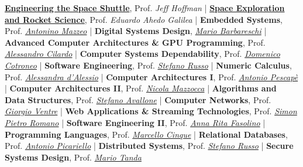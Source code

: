 \documentclass[letterpaper]{twentysecondcv} %
\begin{document}
\href{https://www.edx.org/course/engineering-the-space-shuttle}{\textbf{Engineering the Space Shuttle}}, Prof. \textit{Jeff Hoffman} |
\href{https://www.edx.org/course/the-conquest-of-space-space-exploration-and-rocket}{\textbf{Space Exploration and Rocket Science}}, Prof. \textit{Eduardo Ahedo Galilea} |
\textbf{Embedded Systems}, Prof. \href{https://www.docenti.unina.it/antonino.mazzeo}{\textit{Antonino Mazzeo}} |
\textbf{Digital Systems Design}, \href{https://www.researchgate.net/profile/Mario_Barbareschi}{\textit{Mario Barbareschi}} |
\textbf{Advanced Computer Architectures \& GPU Programming}, Prof. \href{https://www.docenti.unina.it/alessandro.cilardo}{\textit{Alessandro Cilardo}} |
\textbf{Computer Systems Dependability}, Prof. \href{https://www.docenti.unina.it/domenico.cotroneo}{\textit{Domenico Cotroneo}} |
\textbf{Software Engineering}, Prof. \href{https://www.docenti.unina.it/stefano.russo}{\textit{Stefano Russo}} |
\textbf{Numeric Calculus}, Prof. \href{https://www.docenti.unina.it/alessandra.dalessio}{\textit{Alessandra d'Alessio}} |
\textbf{Computer Architectures I}, Prof. \href{https://www.docenti.unina.it/antonio.pescape}{\textit{Antonio Pescapè}} |
\textbf{Computer Architectures II}, Prof. \href{https://www.docenti.unina.it/nicola.mazzocca}{\textit{Nicola Mazzocca}} |
\textbf{Algorithms and Data Structures}, Prof. \href{https://www.docenti.unina.it/stefano.avallone}{\textit{Stefano Avallone}} |
\textbf{Computer Networks}, Prof. \href{https://www.docenti.unina.it/giorgio.ventre}{\textit{Giorgio Ventre}} |
\textbf{Web Applications \& Streaming Technologies}, Prof. \href{https://www.docenti.unina.it/simonpietro.romano}{\textit{Simon Pietro Romano}} |
\textbf{Software Engineering II}, Prof. \href{https://www.docenti.unina.it/annarita.fasolino}{\textit{Anna Rita Fasolino}} |
\textbf{Programming Languages}, Prof. \href{https://www.docenti.unina.it/marcello.cinque}{\textit{Marcello Cinque}} |
\textbf{Relational Databases}, Prof. \href{https://www.docenti.unina.it/antonio.picariello}{\textit{Antonio Picariello}} |
\textbf{Distributed Systems}, Prof. \href{https://www.docenti.unina.it/stefano.russo}{\textit{Stefano Russo}} |
\textbf{Secure Systems Design}, Prof. \href{ttps://www.docenti.unina.it/mario.tanda}{\textit{Mario Tanda}}
\end{document}

